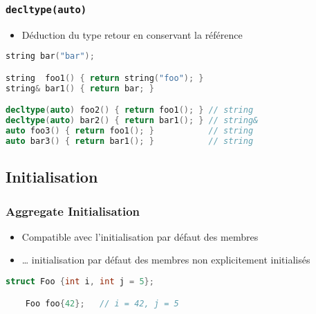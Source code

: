 \documentclass[C++.tex]{subfiles}
\begin{document}
\begin{frame}[fragile]
	\frametitle{\lstinline|decltype(auto)|}
	\begin{itemize}
		\item Déduction du type retour en conservant la référence
	\end{itemize}

	\begin{lstlisting}[language=C++]
string bar("bar");

string  foo1() { return string("foo"); }
string& bar1() { return bar; }

decltype(auto) foo2() { return foo1(); } // string
decltype(auto) bar2() { return bar1(); } // string&
auto foo3() { return foo1(); }           // string
auto bar3() { return bar1(); }           // string\end{lstlisting}
\end{frame}

\subsection*{Initialisation}
\begin{frame}[fragile]
	\frametitle{Aggregate Initialisation}
	\begin{itemize}
		\item Compatible avec l'initialisation par défaut des membres
		\item \ldots{} initialisation par défaut des membres non explicitement initialisés
	\end{itemize}

	\begin{lstlisting}[language=C++]
	struct Foo {int i, int j = 5};

	Foo foo{42};   // i = 42, j = 5\end{lstlisting}
\end{frame}
\end{document}
